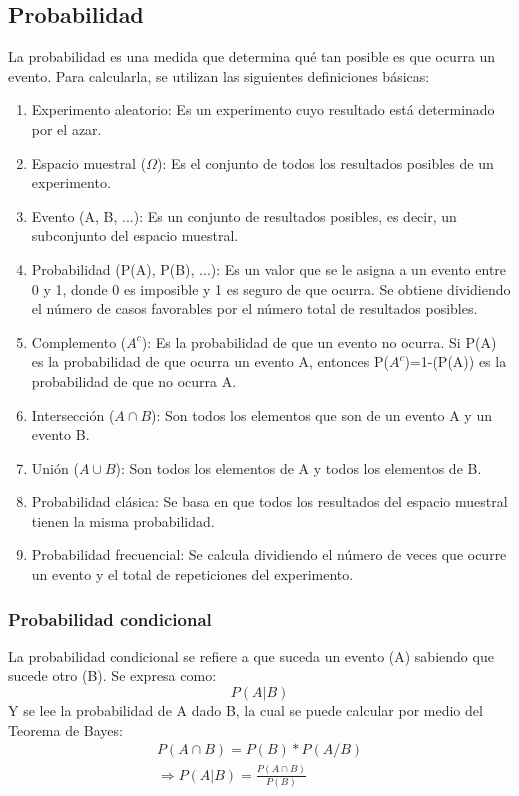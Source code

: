 \documentclass[a4paper, 12pt]{book}
\begin{document}
\subsection{Probabilidad}
La probabilidad es una medida que determina qué tan posible es que ocurra un evento. Para calcularla, se utilizan las siguientes definiciones básicas:
\begin{enumerate}
	\item Experimento aleatorio: Es un experimento cuyo resultado está determinado por el azar.
	\item Espacio muestral ($\Omega$): Es el conjunto de todos los resultados posibles de un experimento.
	\item Evento (A, B, ...): Es un conjunto de resultados posibles, es decir, un subconjunto del espacio muestral.
	\item Probabilidad (P(A), P(B), ...): Es un valor que se le asigna a un evento entre 0 y 1, donde 0 es imposible y 1 es seguro de que ocurra. Se obtiene dividiendo el número de casos favorables por el número total de resultados posibles.
	\item Complemento ($A^c$): Es la probabilidad de que un evento no ocurra. Si P(A) es la probabilidad de que ocurra un evento A, entonces P($A^c$)=1-(P(A)) es la probabilidad de que no ocurra A.
	\item Intersección ($A\cap B$): Son todos los elementos que son de un evento A y un evento B.
	\item Unión ($A \cup B$): Son todos los elementos de A y todos los elementos de B.
	\item Probabilidad clásica: Se basa en que todos los resultados del espacio muestral tienen la misma probabilidad.
	\item Probabilidad frecuencial: Se calcula dividiendo el número de veces que ocurre un evento y el total de repeticiones del experimento.
\end{enumerate}

\subsubsection{Probabilidad condicional}
La probabilidad condicional se refiere a que suceda un evento (A) sabiendo que sucede otro (B). Se expresa como:
\begin{equation}
	P(A|B)
\end{equation}
Y se lee la probabilidad de A dado B, la cual se puede calcular por medio del Teorema de Bayes:
\begin{gather}
	P(A \cap B) = P(B) * P(A/B) \\
	\Rightarrow P(A|B) = \frac{P(A \cap B)}{P(B)}
\end{gather}
\end{document}
